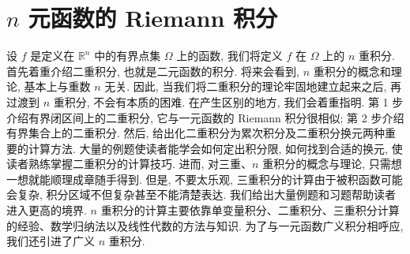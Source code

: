 
\chapter{\texorpdfstring{$n$}{n} 元函数的 Riemann 积分}\label{ch:10}

设 $f$ 是定义在 $\mathbb{R}^{n}$ 中的有界点集 $\Omega$ 上的函数, 我们将定义 $f$ 在 $\Omega$ 上的 $n$ 重积分. 首先着重介绍二重积分, 也就是二元函数的积分. 将来会看到, $n$ 重积分的概念和理论, 基本上与重数 $n$ 无关. 因此, 当我们将二重积分的理论牢固地建立起来之后, 再过渡到 $n$ 重积分, 不会有本质的困难. 在产生区别的地方, 我们会着重指明. 第 1 步介绍有界闭区间上的二重积分, 它与一元函数的 Riemann 积分很相似; 第 2 步介绍有界集合上的二重积分. 然后, 给出化二重积分为累次积分及二重积分换元两种重要的计算方法. 大量的例题使读者能学会如何定出积分限, 如何找到合适的换元, 使读者熟练掌握二重积分的计算技巧. 进而, 对三重、$n$ 重积分的概念与理论, 只需想一想就能顺理成章随手得到. 但是, 不要太乐观, 三重积分的计算由于被积函数可能会复杂, 积分区域不但复杂甚至不能清楚表达. 我们给出大量例题和习题帮助读者进入更高的境界. $n$ 重积分的计算主要依靠单变量积分、二重积分、三重积分计算的经验、数学归纳法以及线性代数的方法与知识. 为了与一元函数广义积分相呼应, 我们还引进了广义 $n$ 重积分.








